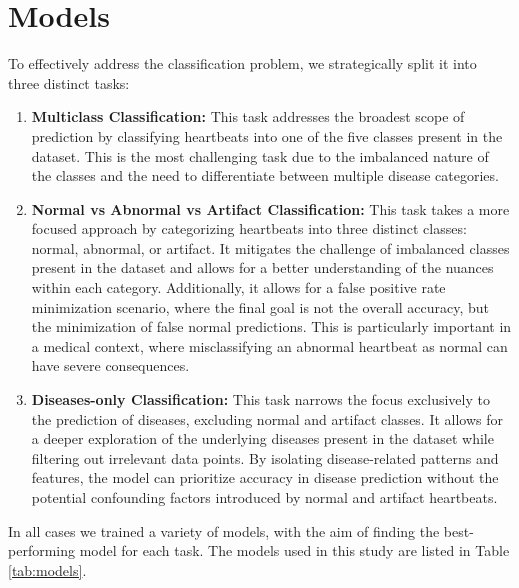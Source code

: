 \section{Models}
To effectively address the classification problem, we strategically split it into three distinct tasks:

\begin{enumerate}[label=\textbf{\arabic*.}, leftmargin=0.5cm]
    \item \textbf{Multiclass Classification:} This task addresses the broadest scope of prediction by classifying heartbeats 
    into one of the five classes present in the dataset. This is the most challenging task due to the imbalanced nature of
    the classes and the need to differentiate between multiple disease categories.
    
    \item \textbf{Normal vs Abnormal vs Artifact Classification:} This task takes a more focused approach by categorizing 
    heartbeats into three distinct classes: normal, abnormal, or artifact. It mitigates the challenge of imbalanced classes 
    present in the dataset and allows for a better understanding of the nuances within each category. Additionally, 
    it allows for a false positive rate minimization scenario, where the final goal is not the overall accuracy, but the 
    minimization of false normal predictions. This is particularly important in a medical context, where misclassifying
    an abnormal heartbeat as normal can have severe consequences.
    
    \item \textbf{Diseases-only Classification:} This task narrows the focus exclusively to the prediction of diseases, 
    excluding normal and artifact classes. It allows for a deeper exploration of the underlying diseases present in the 
    dataset while filtering out irrelevant data points. By isolating disease-related patterns and features, the model 
    can prioritize accuracy in disease prediction without the potential confounding factors introduced by normal and artifact heartbeats.
\end{enumerate}

\noindent
In all cases we trained a variety of models, with the aim of finding the best-performing model for each task.
The models used in this study are listed in Table \ref{tab:models}.

